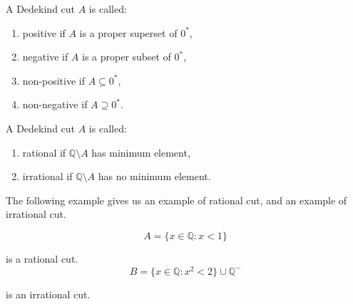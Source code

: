 \begin{definition}
    A Dedekind cut $A$ is called:
    \begin{enumerate}[label = (\roman*)]
        \item positive if $A$ is a proper superset of ${0}^{*}$,
        \item negative if $A$ is a proper subset of ${0}^{*}$,
        \item non-positive if $A\subseteq {0}^{*}$,
        \item non-negative if $A\supseteq {0}^{*}$.
    \end{enumerate}
\end{definition}

\begin{definition}
    A Dedekind cut $ A$ is called:
    \begin{enumerate}[label = (\roman*)]
        \item rational if $\mathbb{Q}\setminus A$ has minimum element,
        \item irrational if $\mathbb{Q}\setminus A$ has no minimum element.
    \end{enumerate}
\end{definition}

\par The following example gives us an example of rational cut, and an example of irrational cut.

\begin{example}
    \[
        A = \{ x\in\mathbb{Q}: x < 1 \}
    \]
    \par is a rational cut.
    \[
        B = \{ x\in\mathbb{Q}: {x}^{2} < 2 \} \cup \mathbb{Q}^{-}
    \]
    \par is an irrational cut.
\end{example}

